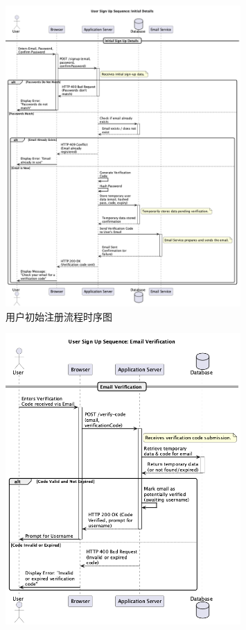 \documentclass[
    report,     %
    oneside,    %
    UTF8,       %
    zihao=-4    %
]{config} %
\begin{document}
\begin{enumerate}[label=(\arabic*)]
\begin{figure}[H]
        \includegraphics[width=0.8\textwidth]{UML/Squence/signup_part1.png}
        \caption{用户初始注册流程时序图}
        \label{fig:UserSignupSequenceDiagram}
    \end{figure}
    \begin{figure}[H]
        \centering
        \includegraphics[width=0.8\textwidth]{UML/Squence/signup_part2.png}

\end{figure}
\end{enumerate}
\end{document}
